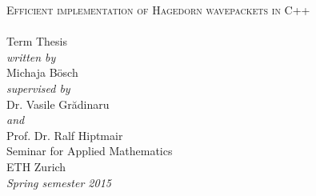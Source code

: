\begin{titlepage}
\begin{center}
  \hfill
  \vspace{3.0cm}

  {\huge \textsc{Efficient implementation of Hagedorn wavepackets in C++\\[10pt]
  }}
  ~\\[20pt]

  {\huge{Term Thesis}}\\[2.5cm]

  {\emph{written by}}\\
  Michaja Bösch
  \\[0.6cm]
  {\emph{supervised by}}\\
  Dr. Vasile Gr\u{a}dinaru\\
  {\emph{and}}\\
  Prof. Dr. Ralf Hiptmair
  \\[2.5cm]

  Seminar for Applied Mathematics\\
  ETH Zurich
  \\[0.5cm]
  \emph{{Spring semester 2015}}
\end{center}
\end{titlepage}